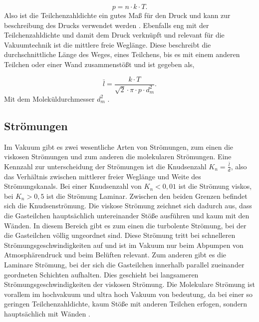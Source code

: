     \begin{equation}
    \label{equ:2}
        p = n \cdot k \cdot T.
    \end{equation}
Also ist die Teilchenzahldichte ein gutes Maß für den Druck und kann zur beschreibung des Drucks verwendet werden \cite{Pfeiffer, S.11}.
Ebenfalls eng mit der Teilchenzahldichte und damit dem Druck verknüpft und relevant für die Vakuumtechnik ist die mittlere freie Weglänge.
Diese beschreibt die durchschnittliche Länge des Weges, eines Teilchens, bis es mit einem anderen Teilchen oder einer Wand zusammenstößt 
und ist gegeben als,

\begin{equation}
\label{equ:3}
    \bar{l} = \frac{k \cdot T}{\sqrt{2} \cdot \pi \cdot p \cdot d_m^2}.
\end{equation}
Mit dem Moleküldurchmesser $d_m^2$ \cite{Pfeiffer, S.12}.


\subsection{Strömungen}
\label{sec:Strömungen}
Im Vakuum gibt es zwei wesentliche Arten von Strömungen, zum einen die viskosen Strömungen und zum anderen die molekularen Strömungen.
Eine Kennzahl zur unterscheidung der Strömungen ist die Knudsenzahl $K_n = \frac{\bar{l}}{d}$, also das Verhältnis zwischen mittlerer freier Weglänge 
und Weite des Strömungskanals.
Bei einer Knudsenzahl von $K_n < 0,01$ ist die Strömung viskos, bei $K_n > 0,5$ ist die Strömung Laminar. Zwischen den beiden Grenzen befindet sich die 
Knudsenströmung.
Die viskose Strömung zeichnet sich dadurch aus, dass die Gasteilchen hauptsächlich untereinander Stöße ausführen und kaum mit den Wänden.
In diesem Bereich gibt es zum einen die turbolente Strömung, bei der die Gasteilchen völlig ungeordnet sind. Diese Strömung tritt bei schnelleren 
Strömungsgeschwindigkeiten auf und ist im Vakuum nur beim Abpumpen von Atmosphärendruck und beim Belüften relevant.
Zum anderen gibt es die Laminare Strömung, bei der sich die Gasteilchen innerhalb parallel zueinander geordneten Schichten aufhalten.
Dies geschieht bei langsameren Strömungsgeschwindigkeiten der viskosen Strömung.
Die Molekulare Strömung ist vorallem im hochvakuum und ultra hoch Vakuum von bedeutung, da bei einer so geringen Teilchenzahldichte, kaum Stöße mit anderen Teilchen erfogen, 
sondern hauptsächlich mit Wänden \cite{Pfeiffer}.


